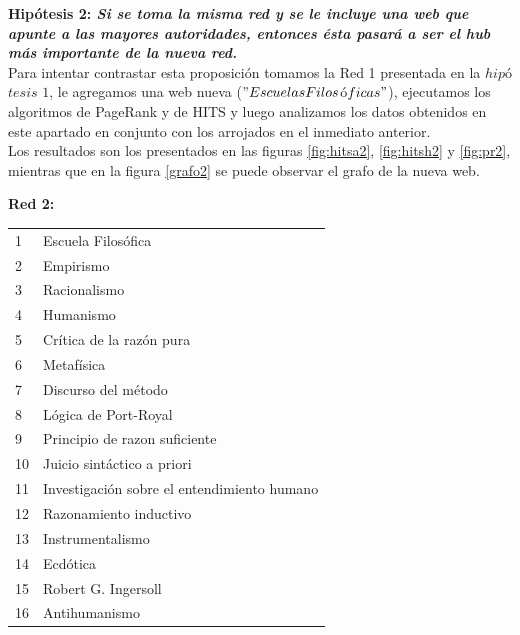 \documentclass[a4paper]{article}
\begin{document}
\newpage

\textbf{Hipótesis 2: \itshape{Si se toma la misma red y se le incluye una web que apunte a las mayores autoridades, entonces ésta pasará a ser el hub más importante de la nueva red. }}\\

Para intentar contrastar esta proposición tomamos la Red 1 presentada en la $hip$ó$tesis$ $1$, le agregamos una web nueva ($"Escuelas Filos$ó$ficas"$), ejecutamos los algoritmos de PageRank y de HITS y luego analizamos los datos obtenidos en este apartado en conjunto con los arrojados en el inmediato anterior.\\

Los resultados son los presentados en las figuras \ref{fig:hitsa2}, \ref{fig:hitsh2} y \ref{fig:pr2}, mientras que en la figura \ref{grafo2} se puede observar el grafo de la nueva web.

\textbf{Red 2:}\\

\begin{tabular}{l l}
1 & Escuela Filosófica \\
2 & Empirismo \\
3 & Racionalismo \\
4 & Humanismo \\
5 & Crítica de la razón pura \\
6 & Metafísica \\
7 & Discurso del método \\
8 & Lógica de Port-Royal \\
9 & Principio de razon suficiente \\
10 & Juicio sintáctico a priori \\
11 & Investigación sobre el entendimiento humano \\
12 & Razonamiento inductivo \\
13 & Instrumentalismo \\
14 & Ecdótica \\
15 & Robert G. Ingersoll \\
16 & Antihumanismo \\
\end{tabular}
\end{document}

